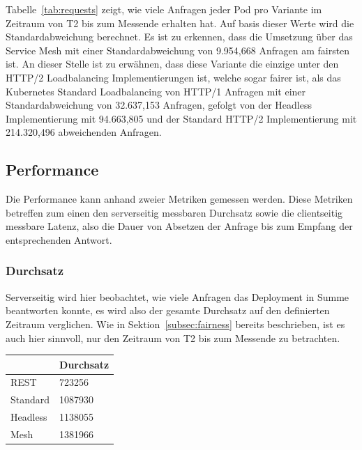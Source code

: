 Tabelle~\ref{tab:requests} zeigt, wie viele Anfragen jeder Pod pro Variante im Zeitraum von T2 bis zum Messende erhalten hat.
Auf basis dieser Werte wird die Standardabweichung berechnet.
Es ist zu erkennen, dass die Umsetzung über das Service Mesh mit einer Standardabweichung von 9.954,668 Anfragen am fairsten ist.
An dieser Stelle ist zu erwähnen, dass diese Variante die einzige unter den HTTP/2 Loadbalancing Implementierungen ist, welche sogar fairer ist, als das Kubernetes Standard Loadbalancing von HTTP/1 Anfragen mit einer Standardabweichung von 32.637,153 Anfragen, gefolgt von der Headless Implementierung mit 94.663,805 und der Standard HTTP/2 Implementierung mit 214.320,496 abweichenden Anfragen.

\subsection{Performance}\label{subsec:performance}

Die Performance kann anhand zweier Metriken gemessen werden.
Diese Metriken betreffen zum einen den serverseitig messbaren Durchsatz sowie die clientseitig messbare Latenz, also die Dauer von Absetzen der Anfrage bis zum Empfang der entsprechenden Antwort.

\subsubsection{Durchsatz}

Serverseitig wird hier beobachtet, wie viele Anfragen das Deployment in Summe beantworten konnte, es wird also der gesamte Durchsatz auf den definierten Zeitraum verglichen.
Wie in Sektion~\ref{subsec:fairness} bereits beschrieben, ist es auch hier sinnvoll, nur den Zeitraum von T2 bis zum Messende zu betrachten.

\begin{table}[H]
    \centering
    \begin{tabular}{|l|l|}
        \hline
        & Durchsatz \\ \hline
        REST     & 723256    \\ \hline
        Standard & 1087930   \\ \hline
        Headless & 1138055   \\ \hline
        Mesh     & 1381966   \\ \hline
    \end{tabular}
\end{table}\label{tab:durchsatz}

